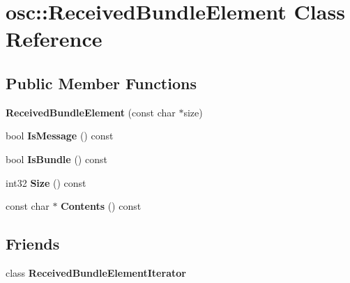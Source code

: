 \hypertarget{classosc_1_1_received_bundle_element}{}\section{osc\+:\+:Received\+Bundle\+Element Class Reference}
\label{classosc_1_1_received_bundle_element}
\subsection*{Public Member Functions}
\begin{DoxyCompactItemize}
\item 
\mbox{\label{classosc_1_1_received_bundle_element_afaeccb13a394d38eb01430c86809349a}} 
{\bfseries Received\+Bundle\+Element} (const char $\ast$size)
\item 
\mbox{\label{classosc_1_1_received_bundle_element_a7b92faafe95d220d53c07aec0175484b}} 
bool {\bfseries Is\+Message} () const
\item 
\mbox{\label{classosc_1_1_received_bundle_element_aff6162bdab704307981f1dd8ed9bd0bc}} 
bool {\bfseries Is\+Bundle} () const
\item 
\mbox{\label{classosc_1_1_received_bundle_element_af29526ca51132ba85bf43596f42b59ee}} 
int32 {\bfseries Size} () const
\item 
\mbox{\label{classosc_1_1_received_bundle_element_ad96d6a77f416346740558247d53e07dd}} 
const char $\ast$ {\bfseries Contents} () const
\end{DoxyCompactItemize}
\subsection*{Friends}
\begin{DoxyCompactItemize}
\item 
\mbox{\label{classosc_1_1_received_bundle_element_a845068a0b95f8b9d2fcfcdbef77d57f8}} 
class {\bfseries Received\+Bundle\+Element\+Iterator}
\end{DoxyCompactItemize}



